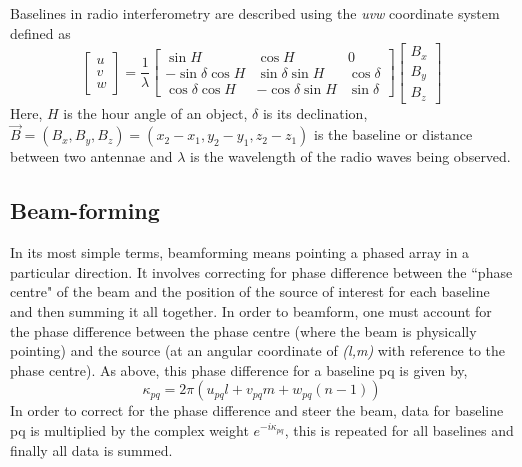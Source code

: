 Baselines in radio interferometry are described using the \textit{uvw} coordinate system defined as
\[
\begin{bmatrix}
    u \\
    v \\
    w
\end{bmatrix}
=
\dfrac{1}{\lambda}
\begin{bmatrix}
    \sin H       & \cos H & 0 \\
    -\sin \delta \cos H       & \sin \delta \sin H & \cos \delta \\
    \cos \delta \cos H       & -\cos \delta \sin H & \sin \delta
    

\end{bmatrix}
%
\begin{bmatrix}
    B_x \\
    B_y \\
    B_z
    

\end{bmatrix}
\]
Here, $H$ is the hour angle of an object, $\delta$ is its declination, $\Vec{B}=(B_x, B_y, B_z)=(x_2-x_1,y_2-y_1,z_2-z_1)$ is the baseline or distance between two antennae and $\lambda$ is the wavelength of the radio waves being observed.
\subsection{Beam-forming}
\label{sec:beamform_theory}
In its most simple terms, beamforming  means pointing a phased array in a particular direction. It involves correcting for phase difference between the ``phase centre" of the beam and the position of the source of interest for each baseline and then summing it all together. %
In order to beamform, one must account for the phase difference between the phase centre (where the beam is physically pointing) and the source (at an angular coordinate of \textit{(l,m)} with reference to the phase centre). As above, this phase difference for a baseline pq is given by, 
$$\kappa_{pq} = 2\pi(u_{pq}l+v_{pq}m+w_{pq}(n-1))$$
In order to correct for the phase difference and steer the beam, data for baseline pq is multiplied by the complex weight $e^{-i\kappa_{pq}}$, this is repeated for all baselines and finally all data is summed.

